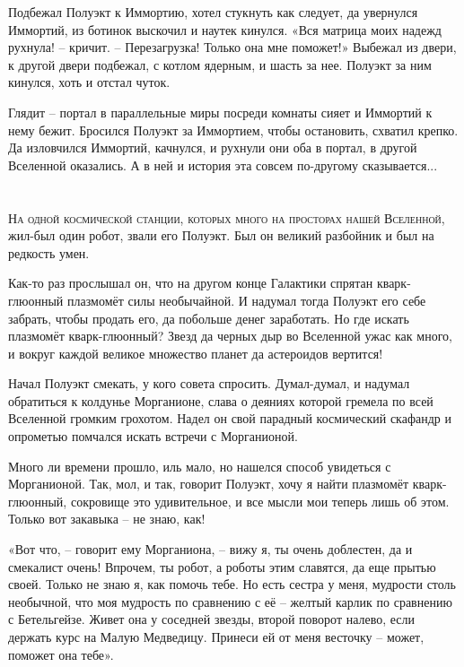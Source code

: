 \documentclass[ebook,oneside,final,openright]{memoir}
\begin{document}
\par
Подбежал Полуэкт к Иммортию, хотел стукнуть как следует, да увернулся Иммортий, из ботинок выскочил и наутек кинулся. «Вся матрица моих надежд рухнула! – кричит. – Перезагрузка! Только она мне поможет!» Выбежал из двери, к другой двери подбежал, с котлом ядерным, и шасть за нее. Полуэкт за ним кинулся, хоть и отстал чуток.\par
\par
Глядит – портал в параллельные миры посреди комнаты сияет и Иммортий к нему бежит. Бросился Полуэкт за Иммортием, чтобы остановить, схватил крепко. Да изловчился Иммортий, качнулся, и рухнули они оба в портал, в другой Вселенной оказались. А в ней и история эта совсем по-другому сказывается...\par

\chapter{}
 \lettrine{Н}{а одной космической станции, которых много на просторах нашей Вселенной,} жил-был один робот, звали его Полуэкт. Был он великий разбойник и был на редкость умен.\par
\par
Как-то раз прослышал он, что на другом конце Галактики спрятан кварк-глюонный плазмомёт силы необычайной. И надумал тогда Полуэкт его себе забрать, чтобы продать его, да побольше денег заработать. Но где искать плазмомёт кварк-глюонный? Звезд да черных дыр во Вселенной ужас как много, и вокруг каждой великое множество планет да астероидов вертится!\par
\par
Начал Полуэкт смекать, у кого совета спросить. Думал-думал, и надумал обратиться к колдунье Морганионе, слава о деяниях которой гремела по всей Вселенной громким грохотом. Надел он свой парадный космический скафандр и опрометью помчался искать встречи с Морганионой.\par
\par
Много ли времени прошло, иль мало, но нашелся способ увидеться с Морганионой. Так, мол, и так, говорит Полуэкт, хочу я найти плазмомёт кварк-глюонный, сокровище это удивительное, и все мысли мои теперь лишь об этом. Только вот закавыка – не знаю, как!\par
\par
«Вот что, – говорит ему Морганиона, – вижу я, ты очень доблестен, да и смекалист очень! Впрочем, ты робот, а роботы этим славятся, да еще прытью своей. Только не знаю я, как помочь тебе. Но есть сестра у меня, мудрости столь необычной, что моя мудрость по сравнению с её – желтый карлик по сравнению с Бетельгейзе. Живет она у соседней звезды, второй поворот налево, если держать курс на Малую Медведицу. Принеси ей от меня весточку – может, поможет она тебе».\par
\end{document}

